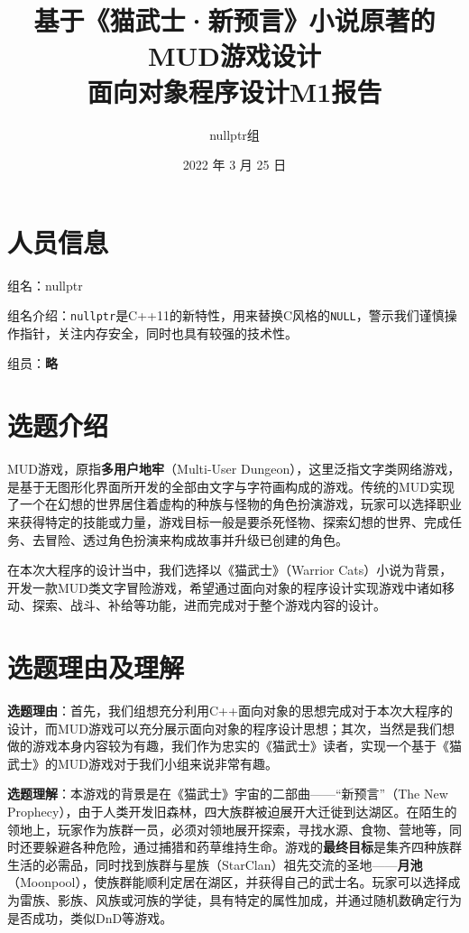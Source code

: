 \documentclass[hyperref,UTF8,a4paper]{ctexart}
\title{基于《猫武士·新预言》小说原著的MUD游戏设计\\
\bigskip \large 面向对象程序设计M1报告}
\author{nullptr组}
\date{2022 年 3 月 25 日}
\begin{document}
\maketitle

\hypertarget{ux4ebaux5458ux4fe1ux606f}{%
\section{人员信息}\label{ux4ebaux5458ux4fe1ux606f}}

组名：nullptr

组名介绍：\texttt{nullptr}是C++11的新特性，用来替换C风格的\texttt{NULL}，警示我们谨慎操作指针，关注内存安全，同时也具有较强的技术性。

组员：\textbf{略}

\hypertarget{ux9009ux9898ux4ecbux7ecd}{%
\section{选题介绍}\label{ux9009ux9898ux4ecbux7ecd}}

MUD游戏，原指\textbf{多用户地牢}（Multi-User
Dungeon），这里泛指文字类网络游戏，是基于无图形化界面所开发的全部由文字与字符画构成的游戏。传统的MUD实现了一个在幻想的世界居住着虚构的种族与怪物的角色扮演游戏，玩家可以选择职业来获得特定的技能或力量，游戏目标一般是要杀死怪物、探索幻想的世界、完成任务、去冒险、透过角色扮演来构成故事并升级已创建的角色。

在本次大程序的设计当中，我们选择以《猫武士》（Warrior
Cats）小说为背景，开发一款MUD类文字冒险游戏，希望通过面向对象的程序设计实现游戏中诸如移动、探索、战斗、补给等功能，进而完成对于整个游戏内容的设计。

\hypertarget{ux9009ux9898ux7406ux7531ux53caux7406ux89e3}{%
\section{选题理由及理解}\label{ux9009ux9898ux7406ux7531ux53caux7406ux89e3}}

\textbf{选题理由}：首先，我们组想充分利用C++面向对象的思想完成对于本次大程序的设计，而MUD游戏可以充分展示面向对象的程序设计思想；其次，当然是我们想做的游戏本身内容较为有趣，我们作为忠实的《猫武士》读者，实现一个基于《猫武士》的MUD游戏对于我们小组来说非常有趣。

\textbf{选题理解}：本游戏的背景是在《猫武士》宇宙的二部曲------``新预言''（The
New
Prophecy），由于人类开发旧森林，四大族群被迫展开大迁徙到达湖区。在陌生的领地上，玩家作为族群一员，必须对领地展开探索，寻找水源、食物、营地等，同时还要躲避各种危险，通过捕猎和药草维持生命。游戏的\textbf{最终目标}是集齐四种族群生活的必需品，同时找到族群与星族（StarClan）祖先交流的圣地------\textbf{月池}（Moonpool），使族群能顺利定居在湖区，并获得自己的武士名。玩家可以选择成为雷族、影族、风族或河族的学徒，具有特定的属性加成，并通过随机数确定行为是否成功，类似DnD等游戏。
\end{document}
